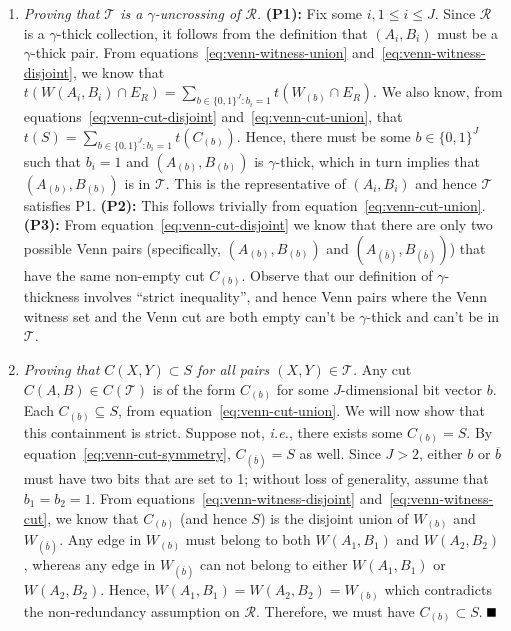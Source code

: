 \documentclass[11pt]{article}
\newcommand{\qed}{\mbox{}\hspace*{\fill}\nolinebreak\mbox{$\rule{0.6em}{0.6em}$}
}
\newenvironment{proofnoqed}{{\bf Proof:}}{}
\newcommand{\coll}{{\mathcal R}}
\newcommand{\colltwo}{{\mathcal T}}
\begin{document}
\begin{proofnoqed}
\begin{enumerate}
\item{\em Proving that $\colltwo$ is a $\gamma$-uncrossing of $\coll$.}  {\bf
    (P1):} Fix some $i, 1\le i\le J$. Since $\coll$ is a $\gamma$-thick
  collection, it follows from the definition that $(A_i, B_i)$ must be a
  $\gamma$-thick pair. From equations~\ref{eq:venn-witness-union}
  and~\ref{eq:venn-witness-disjoint}, we know that $t(W(A_i,B_i) \cap E_R) =
  \sum_{b\in\{0,1\}^J : b_i = 1} t(W_{(b)} \cap E_R)$. We also know, from
  equations~\ref{eq:venn-cut-disjoint} and~\ref{eq:venn-cut-union}, that $t(S)
  = \sum_{b\in\{0,1\}^J : b_i = 1}t(C_{(b)})$. Hence, there must be some $b\in
  \{0,1\}^J$ such that $b_i = 1$ and $(A_{(b)},B_{(b)})$ is $\gamma$-thick,
  which in turn implies that $(A_{(b)},B_{(b)})$ is in $\colltwo$. This is the
  representative of $(A_i,B_i)$ and hence $\colltwo$ satisfies P1.  {\bf
    (P2):} This follows trivially from equation~\ref{eq:venn-cut-union}.  {\bf
    (P3):} From equation~\ref{eq:venn-cut-disjoint} we know that there are
  only two possible Venn pairs (specifically, $(A_{(b)},B_{(b)})$ and
  $(A_{(\overline b)},B_{(\overline b)})$) that have the same non-empty cut
  $C_{(b)}$. Observe that our definition of $\gamma$-thickness involves
  ``strict inequality'', and hence Venn pairs where the Venn witness set and
  the Venn cut are both empty can't be $\gamma$-thick and can't be in
  $\colltwo$.

\item {\em Proving that $C(X,Y) \subset S$ for all pairs $(X,Y)\in \colltwo$.}
  Any cut $C(A,B) \in C(\colltwo)$ is of the form $C_{(b)}$ for some
  $J$-dimensional bit vector $b$. Each $C_{(b)} \subseteq S$, from
  equation~\ref{eq:venn-cut-union}. We will now show that this containment is
  strict. Suppose not, {\em i.e.}, there exists some $C_{(b)} = S$. By
  equation~\ref{eq:venn-cut-symmetry}, $C_{(\overline b)} = S$ as well. Since
  $J > 2$, either $b$ or $\overline b$ must have two bits that are set to 1;
  without loss of generality, assume that $b_1 = b_2 = 1$. From
  equations~\ref{eq:venn-witness-disjoint} and~\ref{eq:venn-witness-cut}, we
  know that $C_{(b)}$ (and hence $S$) is the disjoint union of $W_{(b)}$ and
  $W_{(\overline b)}$. Any edge in $W_{(b)}$ must belong to both $W(A_1,B_1)$
  and $W(A_2, B_2)$, whereas any edge in $W_{(\overline b)}$ can not belong to
  either $W(A_1,B_1)$ or $W(A_2, B_2)$. Hence, $W(A_1, B_1) = W(A_2, B_2) =
  W_{(b)}$ which contradicts the non-redundancy assumption on
  $\coll$. Therefore, we must have $C_{(b)} \subset S$. $\qed$
\end{enumerate}
\end{proofnoqed}
\end{document}
